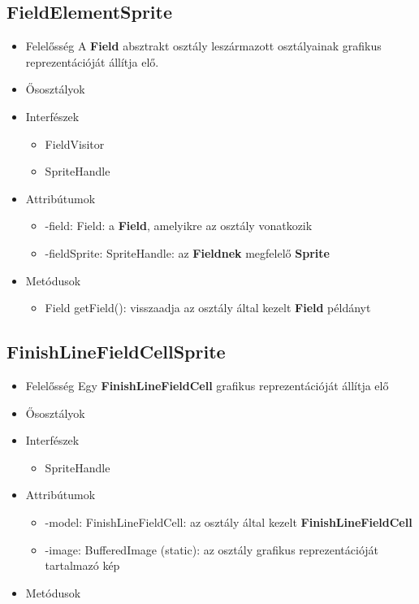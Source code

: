 \subsection{FieldElementSprite}
\begin{itemize}
\item Felelősség \newline
    A \textbf{Field} absztrakt osztály leszármazott osztályainak grafikus reprezentációját állítja elő.
\item Ősosztályok
\item Interfészek
    \begin{itemize}
        \item FieldVisitor
        \item SpriteHandle
    \end{itemize}
\item Attribútumok
    \begin{itemize}
        \item -field: Field: a \textbf{Field}, amelyikre az osztály vonatkozik
        \item -fieldSprite: SpriteHandle: az \textbf{Fieldnek} megfelelő \textbf{Sprite}
    \end{itemize}
\item Metódusok
	\begin{itemize}
        \item Field getField(): visszaadja az osztály által kezelt \textbf{Field} példányt
	\end{itemize}
\end{itemize}

\subsection{FinishLineFieldCellSprite}
\begin{itemize}
\item Felelősség \newline
    Egy \textbf{FinishLineFieldCell} grafikus reprezentációját állítja elő
\item Ősosztályok
\item Interfészek
    \begin{itemize}
        \item SpriteHandle
    \end{itemize}
\item Attribútumok
    \begin{itemize}
        \item -model: FinishLineFieldCell: az osztály által kezelt \textbf{FinishLineFieldCell}
        \item -image: BufferedImage (static): az osztály grafikus reprezentációját tartalmazó kép
    \end{itemize}
\item Metódusok
\end{itemize}

